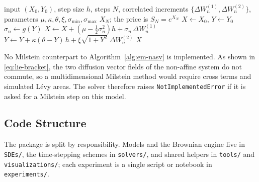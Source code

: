 \documentclass[11pt,a4paper]{article}
\theoremstyle{definition}
\theoremstyle{remark}
\begin{document}
\begin{algorithm}[H]
\caption{Euler--Maruyama for the non-affine model, state $z_n = (X_n, Y_n)$}
\label{alg:em-nasv}
\begin{algorithmic}[1]
\Require input $(X_0, Y_0)$, step size $h$, steps $N$,
         correlated increments $\{\Delta W_n^{(1)}, \Delta W_n^{(2)}\}$,
         parameters $\mu, \kappa, \theta, \xi, \sigma_{\min}, \sigma_{\max}$
\Ensure $X_N$; the price is $S_N = e^{X_N}$
\State $X \leftarrow X_0$, \; $Y \leftarrow Y_0$
    \State $\sigma_n \leftarrow g(Y)$
    \State $X \leftarrow X + \left( \mu - \tfrac12 \sigma_n^2 \right) h
              + \sigma_n\, \Delta W_n^{(1)}$
    \State $Y \leftarrow Y + \kappa (\theta - Y)\, h
              + \xi \sqrt{1 + Y^2}\; \Delta W_n^{(2)}$
\EndFor
\State \Return $X$
\end{algorithmic}
\end{algorithm}

No Milstein counterpart to Algorithm~\ref{alg:em-nasv} is implemented. As shown
in \eqref{eq:lie-bracket}, the two diffusion vector fields of the non-affine
system do not commute, so a multidimensional Milstein method would require
cross terms and simulated L\'evy areas. The solver therefore raises
\texttt{NotImplementedError} if it is asked for a Milstein step on this model.

\subsection{Code Structure}
\label{sec:code-structure}

The package is split by responsibility. Models and the Brownian engine live in
\texttt{SDEs/}, the time-stepping schemes in \texttt{solvers/}, and shared
helpers in \texttt{tools/} and \texttt{visualizations/}; each experiment is a
single script or notebook in \texttt{experiments/}.
\end{document}
